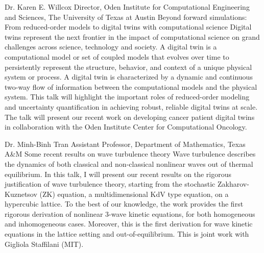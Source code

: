 \label{plenary3}
\plenabs
{Dr. Karen E. Willcox}
{Director, Oden Institute for Computational Engineering and Sciences, The University of Texas at Austin}
{Beyond forward simulations: From reduced-order models to digital twins with computational science}
{Digital twins represent the next frontier in the impact of computational science on grand challenges across science, technology and society. A digital twin is a computational model or set of coupled models that evolves over time to persistently represent the structure, behavior, and context of a unique physical system or process. A digital twin is characterized by a dynamic and continuous two-way flow of information between the computational models and the physical system. This talk will highlight the important roles of reduced-order modeling and uncertainty quantification in achieving robust, reliable digital twins at scale. The talk will present our recent work on developing cancer patient digital twins in collaboration with the Oden Institute Center for Computational Oncology.}
\newpage

\label{plenary4}
\plenabs
{Dr. Minh-Binh Tran}
{Assistant Professor, Department of Mathematics, Texas A\&M}
{Some recent results on wave turbulence theory}
{Wave turbulence describes the dynamics of both classical and non-classical nonlinear waves out of thermal equilibrium. In this talk, I will present our recent results on the rigorous justification of wave turbulence theory, starting from the stochastic Zakharov-Kuznetsov (ZK) equation, a multidimensional KdV type equation, on a hypercubic lattice. To the best of our knowledge, the work provides the first rigorous derivation of nonlinear 3-wave kinetic equations, for both homogeneous and inhomogeneous cases. Moreover, this is the first derivation for wave kinetic equations in the lattice setting and out-of-equilibrium. This is joint work with Gigliola Staffilani (MIT).}
